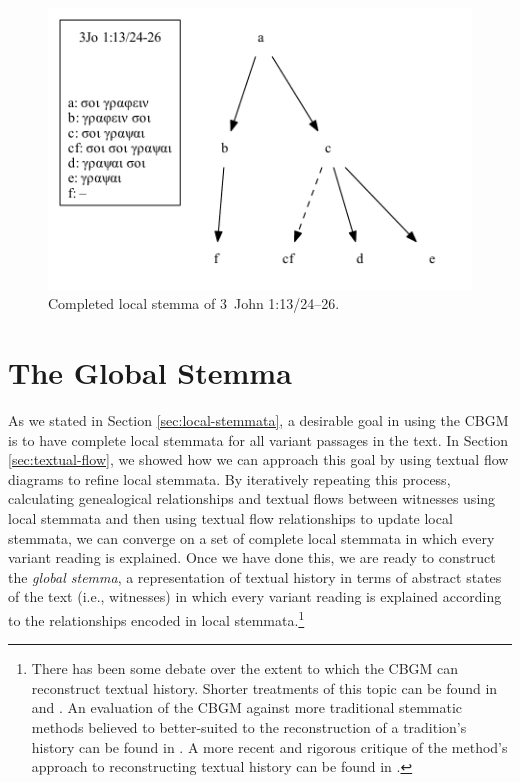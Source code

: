 \documentclass[a4paper, 12pt]{article}
\begin{document}
	\begin{figure}[h!]
		\centering
		\includegraphics[scale=0.6666]{../graphics/B25K1V13U24-26-local-stemma-completed.pdf}
		\caption{Completed local stemma of 3~John 1:13/24–26.}
		\label{fig:local-stemma-completed}
	\end{figure}
	
	\newpage
	
	\section{The Global Stemma}\label{sec:global-stemma}
	As we stated in Section \ref{sec:local-stemmata}, a desirable goal in using the CBGM is to have complete local stemmata for all variant passages in the text. In Section \ref{sec:textual-flow}, we showed how we can approach this goal by using textual flow diagrams to refine local stemmata. By iteratively repeating this process, calculating genealogical relationships and textual flows between witnesses using local stemmata and then using textual flow relationships to update local stemmata, we can converge on a set of complete local stemmata in which every variant reading is explained. Once we have done this, we are ready to construct the \emph{global stemma}, a representation of textual history in terms of abstract states of the text (i.e., witnesses) in which every variant reading is explained according to the relationships encoded in local stemmata.\footnote{There has been some debate over the extent to which the CBGM can reconstruct textual history. Shorter treatments of this topic can be found in \cite{Wachtel15} and \cite{Carlson15}. An evaluation of the CBGM against more traditional stemmatic methods believed to better-suited to the reconstruction of a tradition's history can be found in \cite{Edmondson19}. A more recent and rigorous critique of the method's approach to reconstructing textual history can be found in \cite{Carlson20}.}
	
\end{document}

